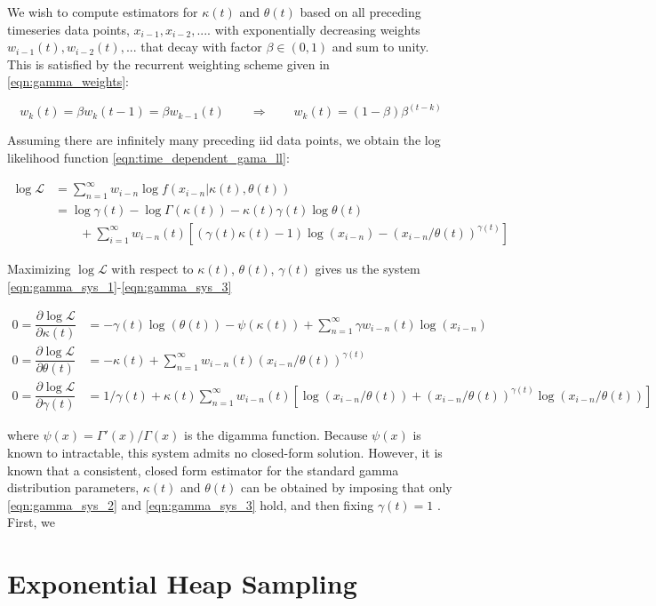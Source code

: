 \documentclass[12pt]{article}
\begin{document}
\noindent We wish to compute estimators for $\kappa(t)$ and $\theta(t)$ based on all preceding timeseries data points, $x_{i-1}, x_{i-2}, ....$ with exponentially decreasing weights $w_{i-1}(t), w_{i-2}(t), ...$ that decay with factor $\beta \in (0, 1)$ and sum to unity. This is satisfied by the recurrent weighting scheme given in \eqref{eqn:gamma_weights}:

\begin{equation}
w_{k}(t) = \beta w_{k}(t-1) = \beta w_{k-1}(t) \qquad\Rightarrow\qquad w_{k}(t) = (1-\beta)\beta^{(t-k)}
\label{eqn:gamma_weights}
\end{equation} 

\noindent Assuming there are infinitely many preceding iid data points, we obtain the log likelihood function \eqref{eqn:time_dependent_gama_ll}:

\begin{align}
\log \mathcal{L} & = \sum_{n=1}^\infty w_{i-n}\log f(x_{i-n}|\kappa(t), \theta(t)) \nonumber\\
& = \log \gamma(t) - \log\Gamma(\kappa(t)) - \kappa(t)\gamma(t)\log \theta(t) \nonumber \\ 
& \qquad +\sum_{i=1}^\infty w_{i-n}(t)[(\gamma(t)\kappa(t) - 1)\log(x_{i-n}) - (x_{i-n}/\theta(t))^{\gamma(t)}]
\label{eqn:time_dependent_gama_ll}
\end{align}

\noindent Maximizing $\log\mathcal{L}$ with respect to $\kappa(t)$, $\theta(t)$, $\gamma(t)$ gives us the system \eqref{eqn:gamma_sys_1}-\eqref{eqn:gamma_sys_3}

\begin{align}
0 = \dfrac{\partial \log\mathcal{L}}{\partial \kappa(t)} &= -\gamma(t)\log(\theta(t)) - \psi(\kappa(t)) + \sum_{n=1}^\infty \gamma w_{i-n}(t) \log(x_{i-n})  \label{eqn:gamma_sys_1}\\
0 = \dfrac{\partial \log\mathcal{L}}{\partial \theta(t)} &= -\kappa(t) + \sum_{n=1}^\infty w_{i-n}(t) (x_{i-n}/\theta(t))^{\gamma(t)} \label{eqn:gamma_sys_2}\\
0 = \dfrac{\partial \log\mathcal{L}}{\partial \gamma(t)} &= 1/\gamma(t) + \kappa(t)\sum_{n=1}^\infty w_{i-n}(t)\left[ \log(x_{i-n}/\theta(t)) + (x_{i-n}/\theta(t))^{\gamma(t)}\log(x_{i-n}/\theta(t)) \right] \label{eqn:gamma_sys_3}
\end{align}

\noindent where $\psi(x) = \Gamma'(x)/\Gamma(x)$ is the digamma function. Because $\psi(x)$ is known to intractable, this system admits no closed-form solution. However, it is known that a consistent, closed form estimator for the standard gamma distribution parameters, $\kappa(t)$ and $\theta(t)$ can be obtained by imposing that only \eqref{eqn:gamma_sys_2} and \eqref{eqn:gamma_sys_3} hold, and then fixing $\gamma(t) = 1$ \cite{gammapaper}. First, we 

\section{Exponential Heap Sampling}
\end{document}
